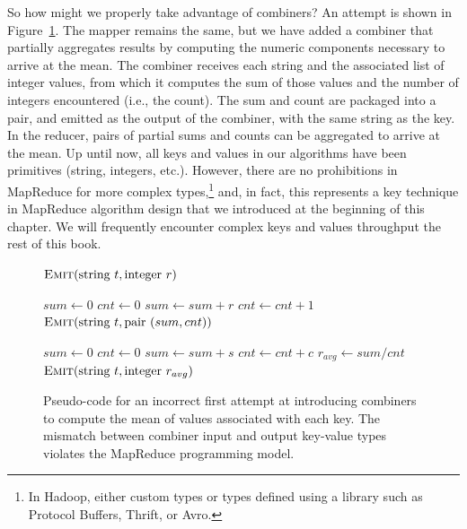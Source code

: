 So how might we properly take advantage of combiners?  An attempt is
shown in Figure~\ref{figure:chapter3:average-fail}.  The mapper
remains the same, but we have added a combiner that partially
aggregates results by computing the numeric components necessary to
arrive at the mean.  The combiner receives each string and the
associated list of integer values, from which it computes the sum of
those values and the number of integers encountered (i.e., the count).
The sum and count are packaged into a pair, and emitted as the output
of the combiner, with the same string as the key.  In the reducer,
pairs of partial sums and counts can be aggregated to arrive at the
mean.  Up until now, all keys and values in our algorithms have been
primitives (string, integers, etc.).  However, there are no
prohibitions in MapReduce for more complex types,\footnote{In Hadoop,
  either custom types or types defined using a library such as
  Protocol Buffers, Thrift, or Avro.} and, in fact, this represents a
key technique in MapReduce algorithm design that we introduced at the
beginning of this chapter.  We will frequently encounter complex keys
and values throughput the rest of this book.

\begin{figure}[t]
\algrenewcommand{}
\algrenewcommand{}
  \begin{algorithmic}[1]
    \State $\textsc{Emit}(\textrm{string }t, \textrm{integer }r)$
    \EndProcedure
    \EndFunction
  \end{algorithmic}

  \begin{algorithmic}[1]
    \State $sum \gets 0$
    \State $cnt \gets 0$
    \State $sum \gets sum + r$
    \State $cnt \gets cnt + 1$
    \EndFor
    \State $\textsc{Emit}(\textrm{string }t, \textrm{pair } (sum, cnt))$
    \EndProcedure
    \EndFunction
  \end{algorithmic}

  \begin{algorithmic}[1]
    \State $sum \gets 0$
    \State $cnt \gets 0$
    \State $sum \gets sum + s$
    \State $cnt \gets cnt + c$
    \EndFor
    \State $r_{avg} \gets sum/cnt$
    \State $\textsc{Emit}(\textrm{string }t, \textrm{integer } r_{avg})$
    \EndProcedure
    \EndFunction
  \end{algorithmic}
  \caption{Pseudo-code for an incorrect first attempt at introducing
    combiners to compute the mean of values associated with each key.
    The mismatch between combiner input and output key-value types
    violates the MapReduce programming model.}
\label{figure:chapter3:average-fail}
\end{figure}

